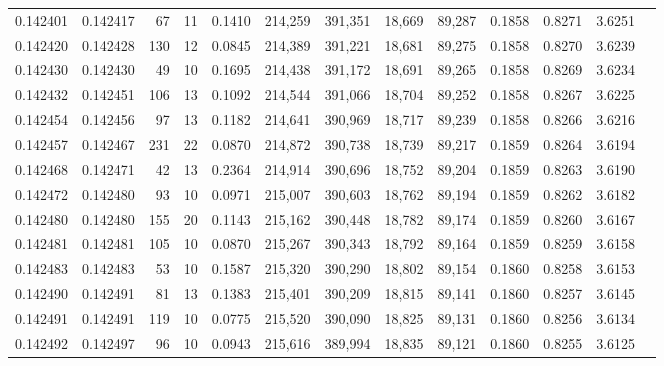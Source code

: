 \begin{tabular}{rrrrrrrrrrrrr}
0.142401 & 0.142417 &    67 &  11 &                                     0.1410 & 214,259 & 391,351 &  18,669 &  89,287 & 0.1858 & 0.8271 & 3.6251 \\
0.142420 & 0.142428 &   130 &  12 &                                     0.0845 & 214,389 & 391,221 &  18,681 &  89,275 & 0.1858 & 0.8270 & 3.6239 \\
0.142430 & 0.142430 &    49 &  10 &                                     0.1695 & 214,438 & 391,172 &  18,691 &  89,265 & 0.1858 & 0.8269 & 3.6234 \\
0.142432 & 0.142451 &   106 &  13 &                                     0.1092 & 214,544 & 391,066 &  18,704 &  89,252 & 0.1858 & 0.8267 & 3.6225 \\
0.142454 & 0.142456 &    97 &  13 &                                     0.1182 & 214,641 & 390,969 &  18,717 &  89,239 & 0.1858 & 0.8266 & 3.6216 \\
0.142457 & 0.142467 &   231 &  22 &                                     0.0870 & 214,872 & 390,738 &  18,739 &  89,217 & 0.1859 & 0.8264 & 3.6194 \\
0.142468 & 0.142471 &    42 &  13 &                                     0.2364 & 214,914 & 390,696 &  18,752 &  89,204 & 0.1859 & 0.8263 & 3.6190 \\
0.142472 & 0.142480 &    93 &  10 &                                     0.0971 & 215,007 & 390,603 &  18,762 &  89,194 & 0.1859 & 0.8262 & 3.6182 \\
0.142480 & 0.142480 &   155 &  20 &                                     0.1143 & 215,162 & 390,448 &  18,782 &  89,174 & 0.1859 & 0.8260 & 3.6167 \\
0.142481 & 0.142481 &   105 &  10 &                                     0.0870 & 215,267 & 390,343 &  18,792 &  89,164 & 0.1859 & 0.8259 & 3.6158 \\
0.142483 & 0.142483 &    53 &  10 &                                     0.1587 & 215,320 & 390,290 &  18,802 &  89,154 & 0.1860 & 0.8258 & 3.6153 \\
0.142490 & 0.142491 &    81 &  13 &                                     0.1383 & 215,401 & 390,209 &  18,815 &  89,141 & 0.1860 & 0.8257 & 3.6145 \\
0.142491 & 0.142491 &   119 &  10 &                                     0.0775 & 215,520 & 390,090 &  18,825 &  89,131 & 0.1860 & 0.8256 & 3.6134 \\
0.142492 & 0.142497 &    96 &  10 &                                     0.0943 & 215,616 & 389,994 &  18,835 &  89,121 & 0.1860 & 0.8255 & 3.6125 \\

\end{tabular}
